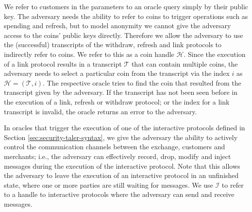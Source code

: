 We refer to customers in the parameters to an oracle query simply by their
public key.  The adversary needs the ability to refer to coins to trigger
operations such as spending and refresh, but to model anonymity we cannot give
the adversary access to the coins' public keys directly.  Therefore we allow
the adversary to use the (successful) transcripts of the withdraw, refresh and
link protocols to indirectly refer to coins.  We refer to this as a coin handle
$\mathcal{H}$.  Since the execution of a link protocol results in a transcript
$\mathcal{T}$ that can contain multiple coins, the adversary needs to select a
particular coin from the transcript via the index $i$ as $\mathcal{H} =
(\mathcal{T}, i)$.  The respective oracle tries to find the coin that resulted
from the transcript given by the adversary.  If the transcript has not been
seen before in the execution of a link, refresh or withdraw protocol; or the
index for a link transcript is invalid, the oracle returns an error to the
adversary.

In oracles that trigger the execution of one of the interactive protocols
defined in Section \ref{sec:security-taler-syntax}, we give the adversary the
ability to actively control the communication channels between the exchange,
customers and merchants; i.e., the adversary can effectively record, drop,
modify and inject messages during the execution of the interactive protocol.
Note that this allows the adversary to leave the execution of an interactive
protocol in an unfinished state, where one or more parties are still waiting
for messages.  We use $\mathcal{I}$ to refer to a handle to interactive
protocols where the adversary can send and receive messages.

